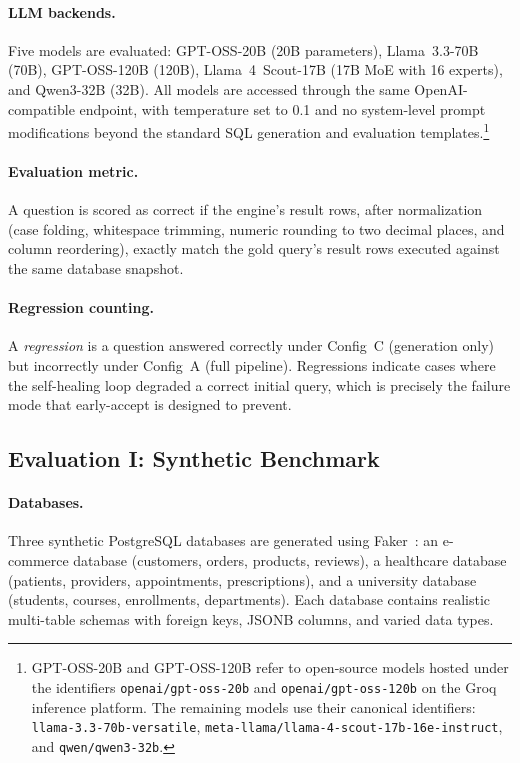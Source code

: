 \documentclass{article}
\begin{document}
\paragraph{LLM backends.} Five models are evaluated: GPT-OSS-20B (20B parameters), Llama~3.3-70B (70B), GPT-OSS-120B (120B), Llama~4~Scout-17B (17B MoE with 16 experts), and Qwen3-32B (32B). All models are accessed through the same OpenAI-compatible endpoint, with temperature set to 0.1 and no system-level prompt modifications beyond the standard SQL generation and evaluation templates.\footnote{GPT-OSS-20B and GPT-OSS-120B refer to open-source models hosted under the identifiers \texttt{openai/gpt-oss-20b} and \texttt{openai/gpt-oss-120b} on the Groq inference platform. The remaining models use their canonical identifiers: \texttt{llama-3.3-70b-versatile}, \texttt{meta-llama/llama-4-scout-17b-16e-instruct}, and \texttt{qwen/qwen3-32b}.}

\paragraph{Evaluation metric.} A question is scored as correct if the engine's result rows, after normalization (case folding, whitespace trimming, numeric rounding to two decimal places, and column reordering), exactly match the gold query's result rows executed against the same database snapshot.

\paragraph{Regression counting.} A \emph{regression} is a question answered correctly under Config~C (generation only) but incorrectly under Config~A (full pipeline). Regressions indicate cases where the self-healing loop degraded a correct initial query, which is precisely the failure mode that early-accept is designed to prevent.


\subsection{Evaluation I: Synthetic Benchmark}
\label{sec:eval_synthetic}

\paragraph{Databases.} Three synthetic PostgreSQL databases are generated using Faker~\citep{faker2023}: an e-commerce database (customers, orders, products, reviews), a healthcare database (patients, providers, appointments, prescriptions), and a university database (students, courses, enrollments, departments). Each database contains realistic multi-table schemas with foreign keys, JSONB columns, and varied data types.
\end{document}
